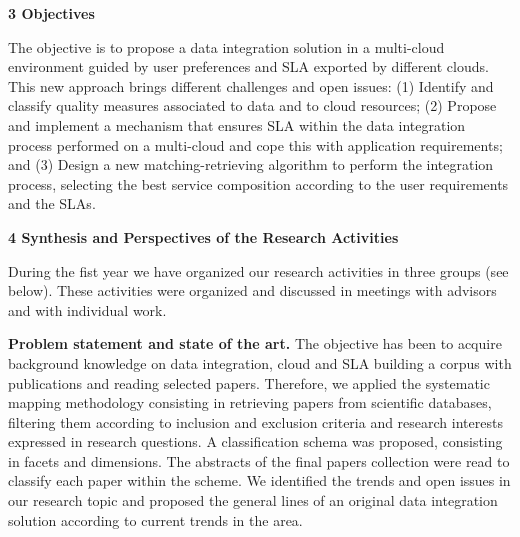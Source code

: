 \documentclass[11pt,a4paper,oneside]{report}
\begin{document}

\begin{flushleft}
\textbf{3 Objectives}\\
\end{flushleft}
The  objective is to propose a data integration solution in a multi-cloud environment guided by user preferences and SLA exported by different clouds. This new approach brings different challenges and open issues: (1)  Identify and classify quality measures associated to data and to cloud resources; (2) Propose and implement a mechanism that ensures SLA within the data integration process  performed on a multi-cloud and cope this with application requirements; and (3) Design a new matching-retrieving algorithm to perform the integration process, selecting the best service composition according to the user requirements and the SLAs.


 
\begin{flushleft}
\textbf{4 Synthesis and Perspectives of the Research Activities}\\
\end{flushleft}
During the fist year we have organized our research activities  in three groups (see below). These activities were organized and discussed in meetings with advisors and with individual work.
%

\noindent
\textbf{Problem statement and state of the art.} The objective has been to acquire background knowledge on data integration, cloud and SLA building a corpus with publications  and reading selected papers. Therefore, we applied the systematic mapping methodology consisting in retrieving papers from scientific databases,   filtering them according to inclusion and exclusion criteria and research interests expressed in research questions. A classification schema was  proposed, consisting in   facets and dimensions. The abstracts of the final papers collection were read  to classify each paper within the scheme.  We identified the trends and open issues in our research topic and proposed the general lines of  an original data integration solution according to current trends in the area.
\end{document}
